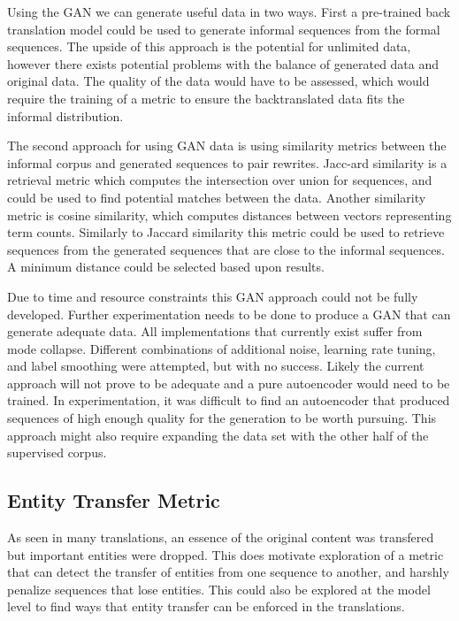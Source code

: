 \documentclass[12pt]{article}
\begin{document}
Using the GAN we can generate useful data in two ways. First a pre-trained
back translation model could be used to generate informal sequences from the 
formal sequences. The upside of this approach is the potential for unlimited data, however
there exists potential problems with the balance of generated data and original data. 
The quality of the data would have to be assessed, which would require the training of a metric 
to ensure the backtranslated data fits the informal distribution. \par 

The second approach for using GAN data is using similarity metrics between
the informal corpus and generated sequences to pair rewrites. Jacc-ard similarity is
a retrieval metric which
computes the intersection over union for sequences, and could be used
to find potential matches between the data. Another similarity metric is cosine similarity, 
which computes distances between vectors representing
term counts. Similarly to Jaccard similarity this metric could be used to retrieve 
sequences from the generated sequences that are close to the informal sequences. A minimum
distance could be selected based upon results. \par

Due to time and resource constraints this GAN approach could not be fully developed.
Further experimentation needs to be done to produce a GAN that can generate 
adequate data. All implementations that currently exist suffer from mode collapse. 
Different combinations of additional noise, learning rate tuning, and label smoothing 
were attempted, but with no success.
Likely the current approach will not prove to be adequate and a pure autoencoder
would need to be trained. In experimentation, it was difficult to find an autoencoder
that produced sequences of high enough quality for the generation to be worth 
pursuing. This approach might also require expanding the data set with the other half
of the supervised corpus. 

\pagebreak
\subsection{Entity Transfer Metric}
As seen in many translations, an essence of the original content was transfered  but important 
entities were dropped. This does motivate exploration
of a metric that can detect the transfer of entities from one sequence to another, and harshly
penalize sequences that lose entities. This could also be explored at the model level
to find ways that entity transfer can be enforced in the translations.
\end{document}
